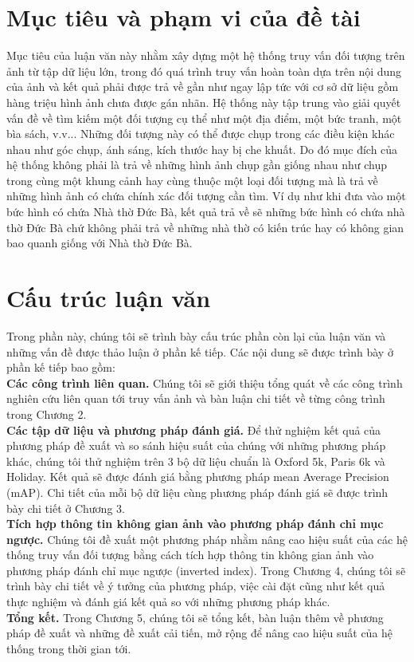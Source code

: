 \section{Mục tiêu và phạm vi của đề tài}
Mục tiêu của luận văn này nhằm xây dựng một hệ thống truy vấn đối tượng trên ảnh từ tập dữ liệu lớn, trong đó quá trình truy vấn hoàn toàn dựa trên nội dung của ảnh và kết quả phải được trả về gần như ngay lập tức với cơ sở dữ liệu gồm hàng triệu hình ảnh chưa được gán nhãn. Hệ thống này tập trung vào giải quyết vấn đề về tìm kiếm một đối tượng cụ thể như một địa điểm, một bức tranh, một bìa sách, v.v... Những đối tượng này có thể được chụp trong các điều kiện khác nhau như góc chụp, ánh sáng, kích thước hay bị che khuất. Do đó mục đích của hệ thống không phải là trả về những hình ảnh chụp gần giống nhau như chụp trong cùng một khung cảnh hay cùng thuộc một loại đối tượng mà là trả về những hình ảnh có chứa chính xác đối tượng cần tìm. Ví dụ như khi đưa vào một bức hình có chứa Nhà thờ Đức Bà, kết quả trả về sẽ những bức hình có chứa nhà thờ Đức Bà chứ không phải trả về những nhà thờ có kiến trúc hay có không gian bao quanh giống với Nhà thờ Đức Bà.\\

\section{Cấu trúc luận văn}
Trong phần này, chúng tôi sẽ trình bày cấu trúc phần còn lại của luận văn và những vấn đề được thảo luận ở phần kế tiếp. Các nội dung sẽ được trình bày ở phần kế tiếp bao gồm:\\
 \textbf{Các công trình liên quan.} Chúng tôi sẽ giới thiệu tổng quát về các công trình nghiên cứu liên quan tới truy vấn ảnh và bàn luận chi tiết về từng công trình trong Chương 2.\\
 \textbf{Các tập dữ liệu và phương pháp đánh giá.} Để thử nghiệm kết quả của phương pháp đề xuất và so sánh hiệu suất của chúng với những phương pháp khác, chúng tôi thử nghiệm trên 3 bộ dữ liệu chuẩn là Oxford 5k, Paris 6k và Holiday. Kết quả sẽ được đánh giá bằng phương pháp mean Average Precision (mAP). Chi tiết của mỗi bộ dữ liệu cùng phương pháp đánh giá sẽ được trình bày chi tiết ở Chương 3.\\
 \textbf{Tích hợp thông tin không gian ảnh vào phương pháp đánh chỉ mục ngược.} Chúng tôi đề xuất một phương pháp nhằm nâng cao hiệu suất của các hệ thống truy vấn đối tượng bằng cách tích hợp thông tin không gian ảnh vào phương pháp đánh chỉ mục ngược (inverted index). Trong Chương 4, chúng tôi sẽ trình bày chi tiết về ý tưởng của phương pháp, việc cài đặt cũng như kết quả thực nghiệm và đánh giá kết quả so với những phương pháp khác.\\
 \textbf{Tổng kết.} Trong Chương 5, chúng tôi sẽ tổng kết, bàn luận thêm về phương pháp đề xuất và những đề xuất cải tiến, mở rộng để nâng cao hiệu suất của hệ thống trong thời gian tới.
 
